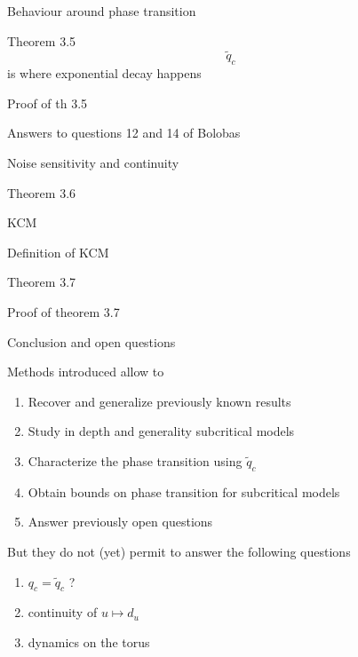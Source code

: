 \documentclass{beamer}
\begin{document}
\begin{section}{Behaviour around phase transition}
	\begin{frame}
		\begin{theorem}{Theorem 3.5}
			$$\tilde q_c $$ is where exponential decay happens
		\end{theorem}
	\end{frame}
	\begin{frame}
		Proof of th 3.5
	\end{frame}

	\begin{frame}
		Answers to questions 12 and 14 of Bolobas
	\end{frame}
	\begin{frame}
		Noise sensitivity and continuity
		\begin{theorem}{Theorem 3.6}
			
		\end{theorem}
	\end{frame}
\end{section}
\begin{section}{KCM}
	\begin{frame}
		Definition of KCM
	\end{frame}
	\begin{frame}
		\begin{theorem}{Theorem 3.7}
			
		\end{theorem}
	\end{frame}
	\begin{frame}
		Proof of theorem 3.7
	\end{frame}
\end{section}
\begin{section}{Conclusion and open questions}
	\begin{frame}
		Methods introduced allow to
		\begin{enumerate}
			\item Recover and generalize previously known results
			\item Study in depth and generality subcritical models
			\item Characterize the phase transition using $\tilde q_c$
			\item Obtain bounds on phase transition for subcritical models
			\item Answer previously open questions
		\end{enumerate}
		But they do not (yet) permit to answer the following questions
		\begin{enumerate}
			\item $q_c = \tilde q_c$ ?
			\item continuity of $u\mapsto d_u$
			\item dynamics on the torus
		\end{enumerate}
	\end{frame}
\end{section}
\end{document}
